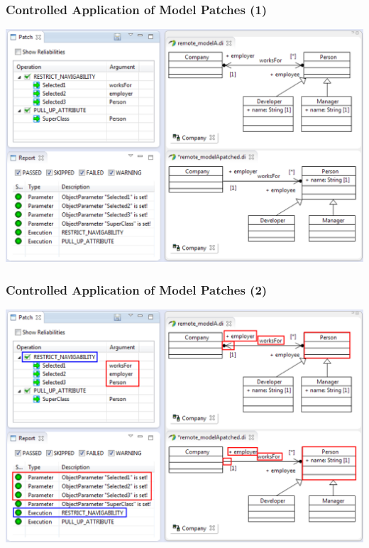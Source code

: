 \begin{frame}
  \frametitle{Controlled Application of Model Patches (1)}
  \begin{center}
  \includegraphics[scale=0.45]{images/patch_01_1}
  \end{center}
\end{frame}
\begin{frame}[noframenumbering]
  \frametitle{Controlled Application of Model Patches (2)}
  \begin{center}
  \includegraphics[scale=0.45]{images/patch_01_2}
  \end{center}
\end{frame}
